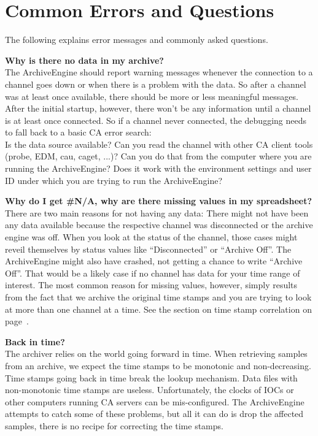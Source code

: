 \chapter{Common Errors and Questions}

The following explains error messages and commonly
asked questions.

\noindent
\textbf{Why is there no data in my archive?}\\
The ArchiveEngine should report warning messages whenever the
connection to a channel goes down or when there is a problem with the
data. So after a channel was at least once available, there should be
more or less meaningful messages. After the initial startup, however,
there won't be any information until a channel is at least once
connected. So if a channel never connected, the debugging needs to
fall back to a basic CA error search:\\
Is the data source available?
Can you read the channel with other CA client tools
(probe, EDM, cau, caget, ...)?
Can you do that from the computer where you are running
the ArchiveEngine? Does it work with the environment settings and user
ID under which you are trying to run the ArchiveEngine?

\noindent
\textbf{Why do I get \#N/A, why are there missing values in my spreadsheet?}\\
There are two main reasons for not having any data: There might not
have been any data available because the respective channel was
disconnected or the archive engine was off. When you look at the
status of the channel, those cases might reveil themselves by status
values like ``Disconnected'' or ``Archive Off''.
The ArchiveEngine might also have crashed, not getting a chance to
write ``Archive Off''. That would be a likely case if no channel has
data for your time range of interest.
The most common reason for missing values, however, simply results
from the fact that we archive the original time stamps and you are
trying to look at more than one channel at a time. See the section on
time stamp correlation on page~\pageref{sec:timestampcorr}.  

\noindent
\textbf{Back in time?}\\
The archiver relies on the world going forward in time. When
retrieving samples from an archive, we expect the time stamps to be
monotonic and non-decreasing. Time stamps going back in time break the
lookup mechanism. Data files with non-monotonic time stamps are
useless. Unfortunately, the clocks of IOCs or other computers running
CA servers can be mis-configured. The ArchiveEngine attempts to catch
some of these problems, but all it can do is drop the affected
samples, there is no recipe for correcting the time stamps.

